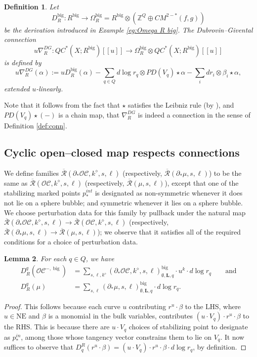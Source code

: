 \documentclass{article}
\newtheorem{lem}{Lemma}[section]
\newtheorem{defn}[lem]{Definition}
\def\nov{r}
\def\cO{\mathcal{O}}
\def\cC{\mathcal{C}}
\def\NE{\mathrm{NE}}
\def\NE{\mathrm{NE}}
\def\Z{\mathbb{Z}}
\def\Rbar{\overline{\mathcal{R}}}
\def\big{{\operatorname{big}}}
\def\bL{\mathbf{L}}
\def\novb{r}
\begin{document}
\begin{defn}
    Let 
    $$D_R^\big: R^\big \to \Omega^\big_R = R^\big \otimes (\Z^Q \oplus CM^{2-*}(f,g))$$ 
    be the derivation introduced in Example \ref{eg:Omega R big}. 
    The \emph{Dubrovin--Givental connection}
    $$u\nabla^{DG}_R: QC^*(X;R^\big)[[u]] \to \Omega_R^\big \otimes QC^*(X;R^\big)[[u]]$$
    is defined by
    $$u\nabla^{DG}_R (\alpha) := uD_R^\big(\alpha) - \sum_{q \in Q} d\log \nov_q \otimes PD(V_q) \star \alpha - \sum_i d\novb_i \otimes \beta_i \star \alpha,$$
    extended $u$-linearly.
\end{defn}

Note that it follows from the fact that $\star$ satisfies the Leibniz rule (by \cite[Lemma 5.3]{relfukii}), and $PD(V_q)\star(-)$ is a chain map, that $\nabla^{DG}_R$ is indeed a connection in the sense of Definition \ref{def:conn}.

\subsection{Cyclic open--closed map respects connections}

We define families $\Rbar(\partial_*\cO\cC,k^\diamond,s,\ell)$ (respectively, $\Rbar(\partial_*\mu,s,\ell)$) to be the same as $\Rbar(\cO\cC,k^\diamond,s,\ell)$ (respectively, $\Rbar(\mu,s,\ell)$), except that one of the stabilizing marked points $p_*^{int}$ is designated as non-symmetric whenever it does not lie on a sphere bubble; and symmetric whenever it lies on a sphere bubble.
We choose perturbation data for this family by pullback under the natural map $\Rbar(\partial_*\cO\cC,k^\diamond,s,\ell) \to \Rbar(\cO\cC,k^\diamond,s,\ell)$ (respectively, $\Rbar(\partial_*\mu,s,\ell) \to \Rbar(\mu,s,\ell)$); we observe that it satisfies all of the required conditions for a choice of perturbation data.

\begin{lem}
    For each $q \in Q$, we have 
    \begin{align*}
        D^q_R(\cO\cC^{-,\big}) &= \sum_{s,\ell,k^\diamond}(\partial_*\cO\cC,k^\diamond,s,\ell)^{\big}_{\emptyset,\bL,q} \cdot u^k \cdot d\log\nov_q \qquad\text{and}\\
        D^q_R(\mu) &= \sum_{s,\ell}(\partial_*\mu,s,\ell)^{\big}_{\emptyset,\bL,q} \cdot d\log\nov_q.
    \end{align*}
\end{lem}
\begin{proof}
    This follows because each curve $u$ contributing $\nov^u \cdot \beta$ to the LHS, where $u \in \NE$ and $\beta$ is a monomial in the bulk variables,  contributes $(u \cdot V_q) \cdot \nov^u \cdot \beta$ to the RHS. 
    This is because there are $u \cdot V_q$ choices of stabilizing point to designate as $p_*^{in}$, among those whose tangency vector constrains them to lie on $V_q$. 
    It now suffices to observe that $D_q^R(\nov^u \cdot \beta) = (u \cdot V_q) \cdot \nov^u \cdot \beta \cdot d\log \nov_q$, by definition.
\end{proof}
\end{document}
